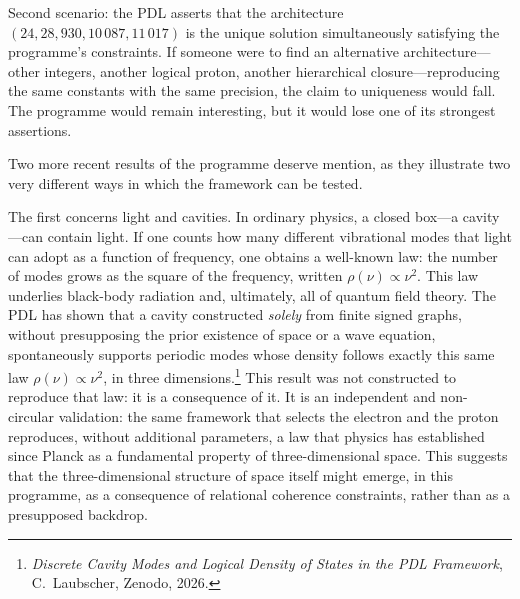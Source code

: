 \documentclass[12pt, a4paper, openright]{book}
\begin{document}
\medskip

Second scenario: the PDL asserts that the architecture $(24, 28, 930, 10\,087, 11\,017)$ is the unique solution simultaneously satisfying the programme's constraints. If someone were to find an alternative architecture---other integers, another logical proton, another hierarchical closure---reproducing the same constants with the same precision, the claim to uniqueness would fall. The programme would remain interesting, but it would lose one of its strongest assertions.

\medskip

Two more recent results of the programme deserve mention, as they illustrate two very different ways in which the framework can be tested.

\medskip

The first concerns light and cavities. In ordinary physics, a closed box---a cavity---can contain light. If one counts how many different vibrational modes that light can adopt as a function of frequency, one obtains a well-known law: the number of modes grows as the square of the frequency, written $\rho(\nu) \propto \nu^2$. This law underlies black-body radiation and, ultimately, all of quantum field theory. The PDL has shown that a cavity constructed \emph{solely} from finite signed graphs, without presupposing the prior existence of space or a wave equation, spontaneously supports periodic modes whose density follows exactly this same law $\rho(\nu) \propto \nu^2$, in three dimensions.\footnote{\textit{Discrete Cavity Modes and Logical Density of States in the PDL Framework}, C.~Laubscher, Zenodo, 2026.} This result was not constructed to reproduce that law: it is a consequence of it. It is an independent and non-circular validation: the same framework that selects the electron and the proton reproduces, without additional parameters, a law that physics has established since Planck as a fundamental property of three-dimensional space. This suggests that the three-dimensional structure of space itself might emerge, in this programme, as a consequence of relational coherence constraints, rather than as a presupposed backdrop.

\medskip
\end{document}

